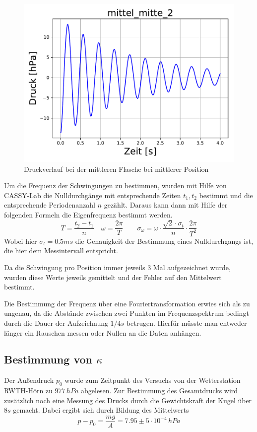 \documentclass[a4paper, 11pt]{article}
\begin{document}
\begin{figure}[H]
	\centering
	\includegraphics[scale=0.4]{../Plots/mittel_mitte_2.pdf}
	\caption{Druckverlauf bei der mittleren Flasche bei mittlerer Position}
\end{figure}

Um die Frequenz der Schwingungen zu bestimmen, wurden mit Hilfe von CASSY-Lab die Nulldurchgänge mit entsprechende Zeiten $t_1,t_2$ bestimmt und die entsprechende Periodenanzahl $n$ gezählt. Daraus kann dann mit Hilfe der folgenden Formeln die Eigenfrequenz bestimmt werden.
\begin{equation}
T = \frac{t_2 - t_1}{n} \quad \omega = \frac{2\pi}{T} \qquad \sigma_\omega = \omega \cdot \frac{\sqrt{2} \cdot \sigma_t }{n} \cdot \frac{2\pi}{T^2}
\end{equation}
Wobei hier $\sigma_t = 0.5 ms$ die Genauigkeit der Bestimmung eines Nulldurchgangs ist, die hier dem Messintervall entspricht.

Da die Schwingung pro Position immer jeweils 3 Mal aufgezeichnet wurde, wurden diese Werte jeweils gemittelt und der Fehler auf den Mittelwert bestimmt. 

Die Bestimmung der Frequenz über eine Fouriertransformation erwies sich als zu ungenau, da die Abstände zwischen zwei Punkten im Frequenzspektrum bedingt durch die Dauer der Aufzeichnung $1/4s$ betrugen. Hierfür müsste man entweder länger ein Rauschen messen oder Nullen an die Daten anhängen.

\subsection{Bestimmung von $\kappa$}
Der Außendruck $p_0$ wurde zum Zeitpunkt des Versuchs von der Wetterstation RWTH-Hörn zu $977 \,hPa$ abgelesen. Zur Bestimmung des Gesamtdrucks wird zusätzlich noch eine Messung des Drucks durch die Gewichtskraft der Kugel über $8s$ gemacht. Dabei ergibt sich durch Bildung des Mittelwerts
\begin{equation}
p-p_0 = \frac{m g}{A} = 7.95 \pm 5 \cdot 10^{-4} \, hPa
\end{equation}
\end{document}
